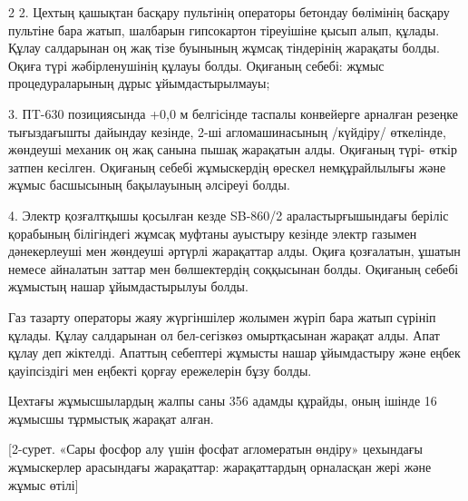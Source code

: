\begin{multicols}{2}
2. Цехтың қашықтан басқару пультінің операторы бетондау бөлімінің
басқару пультіне бара жатып, шалбарын гипсокартон тіреуішіне қысып алып,
құлады. Құлау салдарынан оң жақ тізе буынының жұмсақ тіндерінің жарақаты
болды. Оқиға түрі жәбірленушінің құлауы болды. Оқиғаның себебі: жұмыс
процедураларының дұрыс ұйымдастырылмауы;

3. ПT-630 позициясында +0,0 м белгісінде таспалы конвейерге арналған
резеңке тығыздағышты дайындау кезінде, 2-ші агломашинасының /күйдіру/
өткелінде, жөндеуші механик оң жақ санына пышақ жарақатын алды. Оқиғаның
түрі- өткір затпен кесілген. Оқиғаның себебі жұмыскердің өрескел
немқұрайлылығы және жұмыс басшысының бақылауының әлсіреуі болды.

4. Электр қозғалтқышы қосылған кезде SB-860/2 араластырғышындағы беріліс
қорабының білігіндегі жұмсақ муфтаны ауыстыру кезінде электр газымен
дәнекерлеуші мен жөндеуші әртүрлі жарақаттар
алды. Оқиға қозғалатын, ұшатын немесе айналатын заттар мен бөлшектердің
соққысынан болды. Оқиғаның себебі жұмыстың нашар ұйымдастырылуы болды.

Газ тазарту операторы жаяу жүргіншілер жолымен жүріп бара жатып сүрініп
құлады. Құлау салдарынан ол бел-сегізкөз омыртқасынан жарақат алды. Апат
құлау деп жіктелді. Апаттың себептері жұмысты нашар ұйымдастыру және
еңбек қауіпсіздігі мен еңбекті қорғау ережелерін бұзу болды.

Цехтағы жұмысшылардың жалпы саны 356 адамды құрайды, оның ішінде 16
жұмысшы тұрмыстық жарақат алған.
\end{multicols}

[2-сурет. «Сары фосфор алу үшін фосфат
агломератын өндіру» цехындағы жұмыскерлер арасындағы жарақаттар:
жарақаттардың орналасқан жері және жұмыс өтілі]

